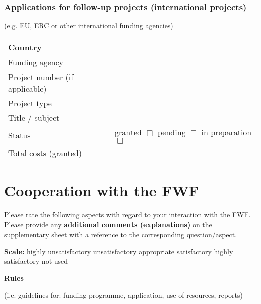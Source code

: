 \documentclass[a4paper, 11pt]{article}
\begin{document}
\subsubsection{Applications for follow-up projects (international projects)} 

(e.g. EU, ERC or other international funding agencies)

\begin{tabular}{|l|l|}
\hline
Country & \\
\hline
Funding agency & 
\\
\hline
Project number (if applicable) & \\
\hline
Project type & \\
\hline
Title / subject & \\
\hline
Status & granted $\Box$ \hspace{1.5cm} pending $\Box$ \hspace{1.5cm} in preparation $\Box$ \\
\hline
Total costs (granted) & \\
\hline
\end{tabular}

\newpage
\section{Cooperation with the FWF}
\setcounter{subsection}{0}

Please rate the following aspects with regard to your interaction with the FWF.
Please provide any \textbf{additional comments (explanations)} on the supplementary sheet
with a reference to the corresponding question/aspect. 

\textbf{Scale:} \newline
{} highly unsatisfactory  \newline
{} unsatisfactory  \newline
{}  appropriate  \newline
{} satisfactory  \newline
{} highly satisfactory  \newline
{}  not used

\textbf{Rules}

(i.e. guidelines for: funding programme, application, use of resources, reports)
\end{document}
